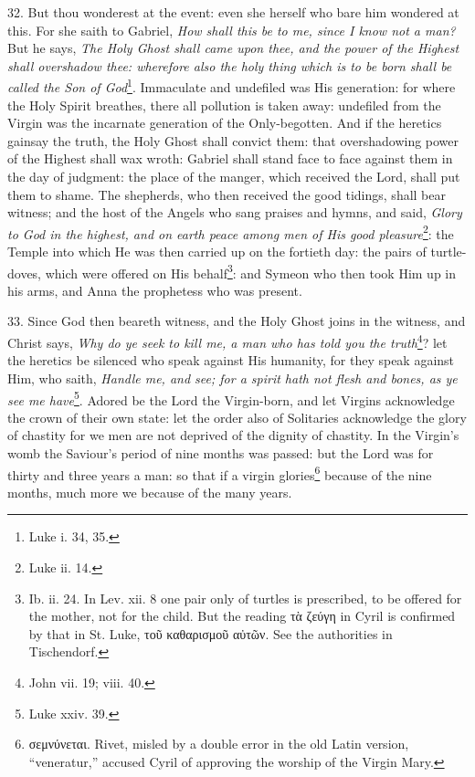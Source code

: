 32. But thou wonderest at the event: even she herself who bare him wondered at this. For she saith to Gabriel, \emph{How shall this be to me, since I know not a man?} But he says, \emph{The Holy Ghost shall came upon thee, and the power of the Highest shall overshadow thee: wherefore also the holy thing which is to be born shall be called the Son of God}\footnote{Luke i. 34, 35.}. Immaculate and undefiled was His generation: for where the Holy Spirit breathes, there all pollution is taken away: undefiled from the Virgin was the incarnate generation of the Only-begotten. And if the heretics gainsay the truth, the Holy Ghost shall convict them: that overshadowing power of the Highest shall wax wroth: Gabriel shall stand face to face against them in the day of judgment: the place of the manger, which received the Lord, shall put them to shame. The shepherds, who then received the good tidings, shall bear witness; and the host of the Angels who sang praises and hymns, and said, \emph{Glory to God in the highest, and on earth peace among men of His good pleasure}\footnote{Luke ii. 14.}: the Temple into which He was then carried up on the fortieth day: the pairs of turtle-doves, which were offered on His behalf\footnote{Ib. ii. 24. In Lev. xii. 8 one pair only of turtles is prescribed, to be offered for the mother, not for the child. But the reading \textgreek{τὰ ζεύγη} in Cyril is confirmed by that in St. Luke, \textgreek{τοῦ καθαρισμοῦ αὐτῶν}. See the authorities in Tischendorf.}: and Symeon who then took Him up in his arms, and Anna the prophetess who was present.

33. Since God then beareth witness, and the Holy Ghost joins in the witness, and Christ says, \emph{Why do ye seek to kill me, a man who has told you the truth}\footnote{John vii. 19; viii. 40.}? let the heretics be silenced who speak against His humanity, for they speak against Him, who saith, \emph{Handle me, and see; for a spirit hath not flesh and bones, as ye see me have}\footnote{Luke xxiv. 39.}. Adored be the Lord the Virgin-born, and let Virgins acknowledge the crown of their own state: let the order also of Solitaries acknowledge the glory of chastity for we men are not deprived of the dignity of chastity. In the Virgin’s womb the Saviour’s period of nine months was passed: but the Lord was for thirty and three years a man: so that if a virgin glories\footnote{\textgreek{σεμνύνεται}. Rivet, misled by a double error in the old Latin version, “veneratur,” accused Cyril of approving the worship of the Virgin Mary.} because of the nine months, much more we because of the many years.

